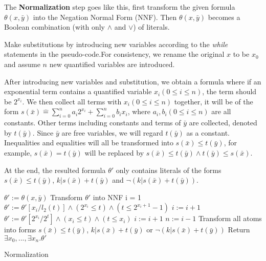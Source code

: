 \documentclass[runningheads]{llncs}
\newcommand{\Def}{\hat{=}}
\begin{document}
The \textbf{Normalization} step goes like this, first transform the given formula $\theta(x,\bar{y})$ into the Negation Normal Form (NNF).
Then $\theta(x,\bar{y})$ becomes a Boolean combination (with only $\wedge$ and $\vee$) of literals.

Make substitutions by introducing new variables according to the \textit{while} statements in the pseudo-code.For consistency, we rename the original $x$ to be $x_0$ and assume $n$ new quantified variables are introduced.

After introducing new variables and substitution, 
we obtain a formula where if an exponential term contains a quantified variable $x_i(0\le i\le n)$, the term should be $2^{x_i}$.
We then collect all terms with $x_i(0\le i\le n)$ together, 
it will be of the form $s(\bar{x})\Def \sum_{i=0}^{n} a_i 2^{x_i} + \sum_{i=0}^n b_i x_i$, where $a_i,b_i(0\le i \le n)$ are all constants.
Other terms including constants and terms of $\bar{y}$ are collected,  
denoted by $t(\bar{y})$. 
Since $\bar{y}$ are free variables, 
we will regard $t(\bar{y})$ as a constant.
Inequalities and equalities will all be transformed into $s(\bar{x})\le t(\bar{y})$, for example, $s(\bar{x}) = t(\bar{y})$ will be replaced by $s(\bar{x})\le t(\bar{y})\wedge t(\bar{y})\le s(\bar{x})$.

At the end, the resulted formula $\theta'$ only contains literals of the forms $s(\bar{x})\le t(\bar{y})$, $k|s(\bar{x})+t(\bar{y})$ and $\neg  (k|s(\bar{x})+t(\bar{y}))$.


\begin{algorithm}[t]
    \SetAlgoLined
    
    $\theta' :=  \theta(x,\bar{y})$ \;
    Transform $\theta'$ into NNF\;
    i = 1\; 
    {
        $\theta' :=  \theta'[x_i/l_2(t)] \wedge (2^{x_i}\le t) \wedge (t\le 2^{x_i+1}-1)$\;
        $i:= i+1$\;
    }
    {
        $\theta' :=  \theta'[2^{x_i}/2^t]\wedge (x_i\le t) \wedge (t \le x_i)$\;
        $i:= i+1$\;
    }
    $n:= i-1$\;
    Transform all atoms into forms $s(\bar{x})\le t(\bar{y})$, $k|s(\bar{x})+t(\bar{y})$ or $\neg  (k|s(\bar{x})+t(\bar{y}))$\;
    Return $\exists x_0,...,\exists x_n. \theta'$
   
    \caption{Normalization}
\end{algorithm}
\end{document}
